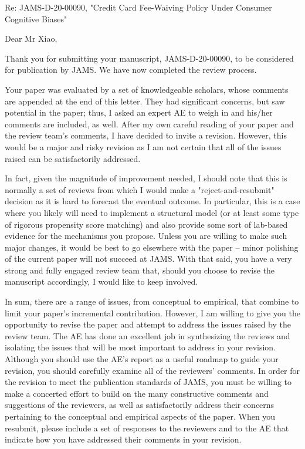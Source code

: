 \documentclass[titlepage,12pt,letterpaper]{article}
\numberwithin{equation}{section}
\begin{document}
Re:  JAMS-D-20-00090, "Credit Card Fee-Waiving Policy Under Consumer Cognitive Biases"

Dear Mr Xiao,

Thank you for submitting your manuscript, JAMS-D-20-00090, to be considered for publication by JAMS. We have now completed the review process.

Your paper was evaluated by a set of knowledgeable scholars, whose comments are appended at the end of this letter. They had significant concerns, but saw potential in the paper; thus, I asked an expert AE to weigh in and his/her comments are included, as well. After my own careful reading of your paper and the review team's comments, I have decided to invite a revision. However, this would be a major and risky revision as I am not certain that all of the issues raised can be satisfactorily addressed.

In fact, given the magnitude of improvement needed, I should note that this is normally a set of reviews from which I would make a "reject-and-resubmit" decision as it is hard to forecast the eventual outcome. In particular, this is a case where you likely will need to implement a structural model (or at least some type of rigorous propensity score matching) and also provide some sort of lab-based evidence for the mechanisms you propose. Unless you are willing to make such major changes, it would be best to go elsewhere with the paper -- minor polishing of the current paper will not succeed at JAMS. With that said, you have a very strong and fully engaged review team that, should you choose to revise the manuscript accordingly, I would like to keep involved.

In sum, there are a range of issues, from conceptual to empirical, that combine to limit your paper's incremental contribution. However, I am willing to give you the opportunity to revise the paper and attempt to address the issues raised by the review team. The AE has done an excellent job in synthesizing the reviews and isolating the issues that will be most important to address in your revision. Although you should use the AE’s report as a useful roadmap to guide your revision, you should carefully examine all of the reviewers' comments. In order for the revision to meet the publication standards of JAMS, you must be willing to make a concerted effort to build on the many constructive comments and suggestions of the reviewers, as well as satisfactorily address their concerns pertaining to the conceptual and empirical aspects of the paper. When you resubmit, please include a set of responses to the reviewers and to the AE that indicate how you have addressed their comments
in your revision.
\end{document}
